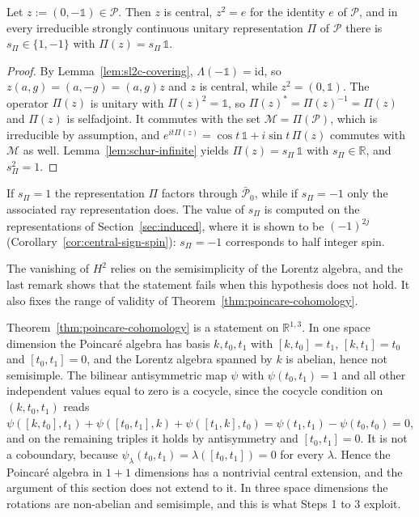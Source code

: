 	\begin{proposition}\label{prop:central-sign}
		Let $z:=(0,-\mathbb{1})\in\mathcal{P}$. Then $z$ is central, $z^2=e$ for the identity $e$ of $\mathcal{P}$, and in every irreducible strongly continuous unitary representation $\Pi$ of $\mathcal{P}$ there is $s_\Pi\in\{1,-1\}$ with $\Pi(z)=s_\Pi\,\mathbb{1}$.
	\end{proposition}
	
	\begin{proof}
		By Lemma~\ref{lem:sl2c-covering}, $\Lambda(-\mathbb{1})=\mathrm{id}$, so $z(a,g)=(a,-g)=(a,g)z$ and $z$ is central, while $z^2=(0,\mathbb{1})$. The operator $\Pi(z)$ is unitary with $\Pi(z)^2=\mathbb{1}$, so $\Pi(z)^*=\Pi(z)^{-1}=\Pi(z)$ and $\Pi(z)$ is selfadjoint. It commutes with the set $\mathcal{M}=\Pi(\mathcal{P})$, which is irreducible by assumption, and $e^{it\Pi(z)}=\cos t\,\mathbb{1}+i\sin t\,\Pi(z)$ commutes with $\mathcal{M}$ as well. Lemma~\ref{lem:schur-infinite} yields $\Pi(z)=s_\Pi\,\mathbb{1}$ with $s_\Pi\in\mathbb{R}$, and $s_\Pi^2=1$.
	\end{proof}
	
	\noindent If $s_\Pi=1$ the representation $\Pi$ factors through $\bar{\mathcal{P}}_0$, while if $s_\Pi=-1$ only the associated ray representation does. The value of $s_\Pi$ is computed on the representations of Section~\ref{sec:induced}, where it is shown to be $(-1)^{2j}$ (Corollary~\ref{cor:central-sign-spin}): $s_\Pi=-1$ corresponds to half integer spin.
	
	The vanishing of $H^2$ relies on the semisimplicity of the Lorentz algebra, and the last remark shows that the statement fails when this hypothesis does not hold. It also fixes the range of validity of Theorem~\ref{thm:poincare-cohomology}.
	
	\begin{remark}\label{rem:one-plus-one}
		Theorem~\ref{thm:poincare-cohomology} is a statement on $\mathbb{R}^{1,3}$. In one space dimension the Poincar\'e algebra has basis $k,t_0,t_1$ with $[k,t_0]=t_1$, $[k,t_1]=t_0$ and $[t_0,t_1]=0$, and the Lorentz algebra spanned by $k$ is abelian, hence not semisimple. The bilinear antisymmetric map $\psi$ with $\psi(t_0,t_1)=1$ and all other independent values equal to zero is a cocycle, since the cocycle condition on $(k,t_0,t_1)$ reads $\psi([k,t_0],t_1)+\psi([t_0,t_1],k)+\psi([t_1,k],t_0)=\psi(t_1,t_1)-\psi(t_0,t_0)=0$, and on the remaining triples it holds by antisymmetry and $[t_0,t_1]=0$. It is not a coboundary, because $\psi_\lambda(t_0,t_1)=\lambda([t_0,t_1])=0$ for every $\lambda$. Hence the Poincar\'e algebra in $1+1$ dimensions has a nontrivial central extension, and the argument of this section does not extend to it. In three space dimensions the rotations are non-abelian and semisimple, and this is what Steps 1 to 3 exploit.
	\end{remark}
	
